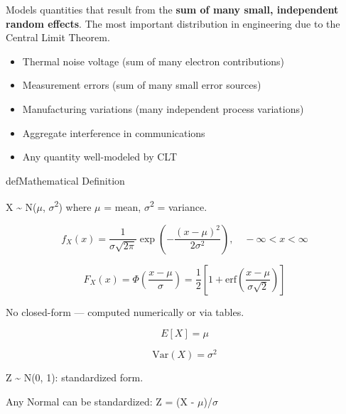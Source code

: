 

Models quantities that result from the \textbf{sum of many small, independent random effects}. The most important distribution in engineering due to the Central Limit Theorem.


\begin{itemize}
\tightlist
\item
  Thermal noise voltage (sum of many electron contributions)
\item
  Measurement errors (sum of many small error sources)
\item
  Manufacturing variations (many independent process variations)
\item
  Aggregate interference in communications
\item
  Any quantity well-modeled by CLT
\end{itemize}

\begin{PSbox}[unbreakable]{def}{Mathematical Definition}

X \textasciitilde{} N(\ensuremath{\mu}, \ensuremath{\sigma}\textsuperscript{2}) where \ensuremath{\mu} = mean, \ensuremath{\sigma}\textsuperscript{2} = variance.

\end{PSbox}


\[f_X(x) = \frac{1}{\sigma\sqrt{2\pi}} \exp\left(-\frac{(x-\mu)^2}{2\sigma^2}\right), \quad -\infty < x < \infty\]


\[F_X(x) = \Phi\left(\frac{x-\mu}{\sigma}\right) = \frac{1}{2}\left[1 + \text{erf}\left(\frac{x-\mu}{\sigma\sqrt{2}}\right)\right]\]

No closed-form — computed numerically or via tables.


\[E[X] = \mu\]


\[\text{Var}(X) = \sigma^2\]


Z \textasciitilde{} N(0, 1): standardized form.

Any Normal can be standardized: Z = (X - \ensuremath{\mu})/\ensuremath{\sigma}

